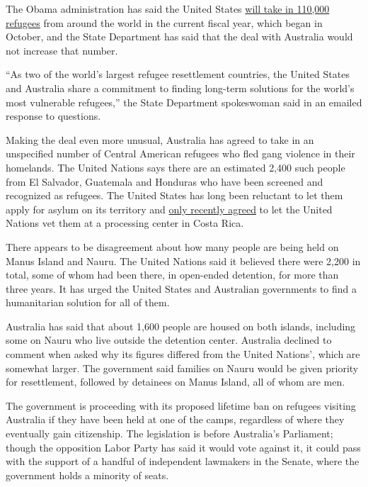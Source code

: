 The Obama administration has said the United States
\href{http://www.nytimes.com/2016/09/19/world/americas/obama-refugee-united-nations.html}{will
take in 110,000 refugees} from around the world in the current fiscal
year, which began in October, and the State Department has said that the
deal with Australia would not increase that number.

``As two of the world's largest refugee resettlement countries, the
United States and Australia share a commitment to finding long-term
solutions for the world's most vulnerable refugees,'' the State
Department spokeswoman said in an emailed response to questions.

Making the deal even more unusual, Australia has agreed to take in an
unspecified number of Central American refugees who fled gang violence
in their homelands. The United Nations says there are an estimated 2,400
such people from El Salvador, Guatemala and Honduras who have been
screened and recognized as refugees. The United States has long been
reluctant to let them apply for asylum on its territory and
\href{http://www.nytimes.com/2016/07/27/us/politics/obama-refugees-central-america.html}{only
recently agreed} to let the United Nations vet them at a processing
center in Costa Rica.

There appears to be disagreement about how many people are being held on
Manus Island and Nauru. The United Nations said it believed there were
2,200 in total, some of whom had been there, in open-ended detention,
for more than three years. It has urged the United States and Australian
governments to find a humanitarian solution for all of them.

Australia has said that about 1,600 people are housed on both islands,
including some on Nauru who live outside the detention center. Australia
declined to comment when asked why its figures differed from the United
Nations', which are somewhat larger. The government said families on
Nauru would be given priority for resettlement, followed by detainees on
Manus Island, all of whom are men.

The government is proceeding with its proposed lifetime ban on refugees
visiting Australia if they have been held at one of the camps,
regardless of where they eventually gain citizenship. The legislation is
before Australia's Parliament; though the opposition Labor Party has
said it would vote against it, it could pass with the support of a
handful of independent lawmakers in the Senate, where the government
holds a minority of seats.

